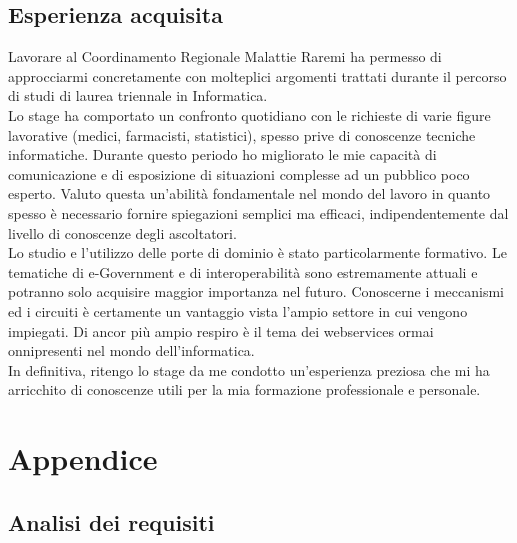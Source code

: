 \documentclass[a4paper]{article}
\newcommand{\crmr}{Coordinamento Regionale Malattie Rare}
\begin{document}
\subsection{Esperienza acquisita}
Lavorare al \crmr mi ha permesso di approcciarmi concretamente con molteplici argomenti trattati durante il percorso di studi di laurea triennale in Informatica.
\\
Lo stage ha comportato un confronto quotidiano con le richieste di varie figure lavorative (medici, farmacisti, statistici), spesso prive di conoscenze tecniche informatiche. Durante questo periodo ho migliorato le mie capacità di comunicazione e di esposizione di situazioni complesse ad un pubblico poco esperto. Valuto questa un'abilità fondamentale nel mondo del lavoro in quanto spesso è necessario fornire spiegazioni semplici ma efficaci, indipendentemente dal livello di conoscenze degli ascoltatori.
\\
Lo studio e l'utilizzo delle porte di dominio è stato particolarmente formativo. Le tematiche di e-Government e di interoperabilità sono estremamente attuali e potranno solo acquisire maggior importanza nel futuro. Conoscerne i meccanismi ed i circuiti è certamente un vantaggio vista l'ampio settore in cui vengono impiegati. Di ancor più ampio respiro è il tema dei webservices ormai onnipresenti nel mondo dell'informatica.
\\
In definitiva, ritengo lo stage da me condotto un'esperienza preziosa che mi ha arricchito di conoscenze utili per la mia formazione professionale e personale.


\newpage

\vspace*{\fill}

\newpage

\section{Appendice}
\label{sec:ap}

\subsection{Analisi dei requisiti}
\end{document}
